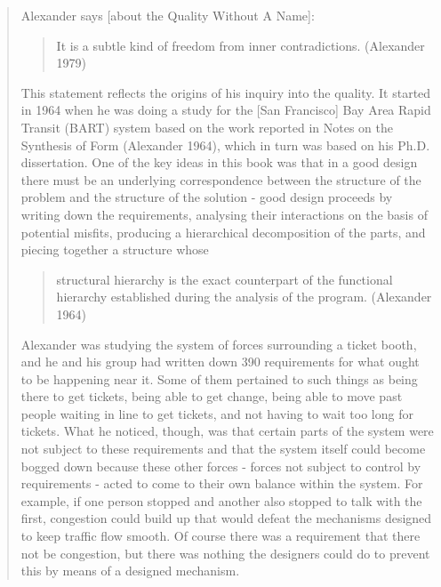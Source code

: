 \begin{quote}
Alexander says [about the Quality Without A Name]:
\begin{quote}
It is a subtle kind of freedom from inner contradictions. (Alexander 1979)                                                                          \end{quote}
This statement reflects the origins of his inquiry into the quality. It started in 1964 when he was doing a study for the [San Francisco] Bay Area Rapid Transit (BART) system based on the work reported in Notes on the Synthesis of Form (Alexander 1964), which in turn was based on his Ph.D. dissertation. One of the key ideas in this book was that in a good design there must be an underlying correspondence between the structure of the problem and the structure of the solution - good design proceeds by writing down the requirements, analysing their interactions on the basis of potential misfits, producing a hierarchical decomposition of the parts, and piecing together a structure whose
\begin{quote}
structural hierarchy is the exact counterpart of the functional hierarchy established during the analysis of the program. (Alexander 1964)\end{quote} 
Alexander was studying the system of forces surrounding a ticket booth, and he and his group had written down 390 requirements for what ought to be happening near it. Some of them pertained to such things as being there to get tickets, being able to get change, being able to move past people waiting in line to get tickets, and not having to wait too long for tickets. What he noticed, though, was that certain parts of the system were not subject to these requirements and that the system itself could become bogged down because these other forces - forces not subject to control by requirements - acted to come to their own balance within the system. For example, if one person stopped and another also stopped to talk with the first, congestion could build up that would defeat the mechanisms designed to keep traffic flow smooth. Of course there was a requirement that there not be congestion, but there was nothing the designers could do to prevent this by means of a designed mechanism.                                                                                                                                                                                                                                                                                                                                                                                                                                                                                                                                                                                                                                                                                                                                                                                                                                                                                                                                                                                                                                 \end{quote} 

